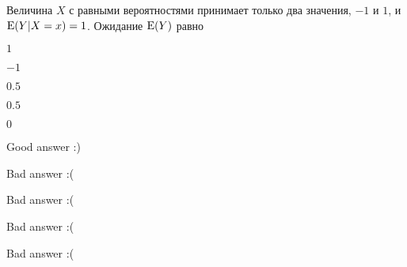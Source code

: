 
\begin{question}
Величина \(X\) с равными вероятностями принимает только два значения,
\(-1\) и \(1\), и \(\operatorname{E}(Y|X=x)=1\). Ожидание \(\operatorname{E}(Y)\) равно
\begin{answerlist}
  \item \(1\)
  \item \(-1\)
  \item \(0.5\)
  \item \(0.5\)
  \item \(0\)
\end{answerlist}
\end{question}

\begin{solution}
\begin{answerlist}
  \item Good answer :)
  \item Bad answer :(
  \item Bad answer :(
  \item Bad answer :(
  \item Bad answer :(
\end{answerlist}
\end{solution}

